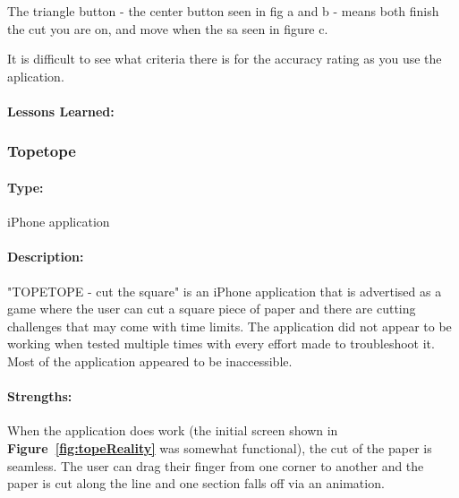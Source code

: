 \documentclass[11pt]{article}
\begin{document}
                The triangle button - the center button seen in fig a and b - means both finish the cut you are on, and move when the sa seen in figure c.  
                
                It is difficult to see what criteria there is for the accuracy rating as you use the aplication. 

                
                \paragraph{Lessons Learned:}
                
                \subsubsection{Topetope}
                 
                \paragraph{Type:} iPhone application 

                \paragraph{Description:}
                "TOPETOPE - cut the square" is an iPhone application that is advertised as a game where the user can cut a square piece of paper and there are cutting challenges that may come with time limits. The application did not appear to be working when tested multiple times with every effort made to troubleshoot it. Most of the application appeared to be inaccessible. 
                
                \paragraph{Strengths:}
                When the application does work (the initial screen shown in \textbf{Figure~\ref{fig:topeReality}} was somewhat functional), the cut of the paper is seamless. The user can drag their finger from one corner to another and the paper is cut along the line and one section falls off via an animation.
                
\end{document}
